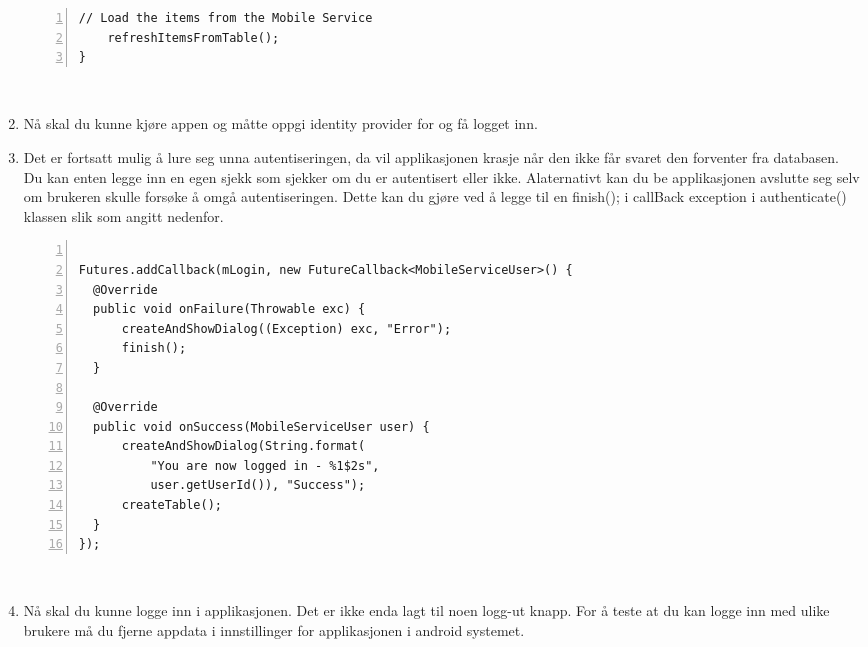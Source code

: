 \begin{enumerate}
\begin{lstlisting}[numbers=left, captionpos=b,   caption={Eksempel som viser hvordan createTable() klassen kan se ut.}, ]
    // Load the items from the Mobile Service
    refreshItemsFromTable();
}
\end{lstlisting}
\\
\item Nå skal du kunne kjøre appen og måtte oppgi identity provider for og få logget inn. \\
\item Det er fortsatt mulig å lure seg unna autentiseringen, da vil applikasjonen krasje når den ikke får svaret den forventer fra databasen. Du kan enten legge inn en egen sjekk som sjekker om du er autentisert eller ikke. Alaternativt kan du be applikasjonen avslutte seg selv om brukeren skulle forsøke å omgå autentiseringen. Dette kan du gjøre ved å legge til en finish(); i callBack exception i authenticate() klassen slik som angitt nedenfor.
\\
\begin{lstlisting}[numbers=left, captionpos=b,   caption={Eksempel som viser hvordan onFailure() kan se ut om det legges til en finish(); .},]

Futures.addCallback(mLogin, new FutureCallback<MobileServiceUser>() {
  @Override
  public void onFailure(Throwable exc) {
      createAndShowDialog((Exception) exc, "Error");
      finish();
  }

  @Override
  public void onSuccess(MobileServiceUser user) {
      createAndShowDialog(String.format(
          "You are now logged in - %1$2s",
          user.getUserId()), "Success");
      createTable();
  }
});

\end{lstlisting}
\\
\item Nå skal du kunne logge inn i applikasjonen. Det er ikke enda lagt til noen logg-ut knapp. For å teste at du kan logge inn med ulike brukere må du fjerne appdata i innstillinger for applikasjonen i android systemet. 
\end{enumerate}
